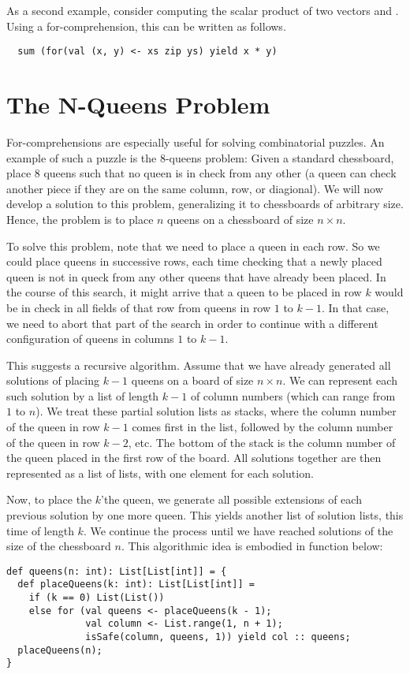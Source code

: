 As a second example, consider computing the scalar product of two
vectors  and . Using a for-comprehension, this can
be written as follows.
\begin{lstlisting}
  sum (for(val (x, y) <- xs zip ys) yield x * y)
\end{lstlisting}

\section{The N-Queens Problem}

For-comprehensions are especially useful for solving combinatorial
puzzles. An example of such a puzzle is the 8-queens problem: Given a
standard chessboard, place 8 queens such that no queen is in check from any
other (a queen can check another piece if they are on the same
column, row, or diagional). We will now develop a solution to this
problem, generalizing it to chessboards of arbitrary size. Hence, the
problem is to place $n$ queens on a chessboard of size $n \times n$.

To solve this problem, note that we need to place a queen in each row.
So we could place queens in successive rows, each time checking that a
newly placed queen is not in queck from any other queens that have
already been placed. In the course of this search, it might arrive
that a queen to be placed in row $k$ would be in check in all fields
of that row from queens in row $1$ to $k-1$. In that case, we need to
abort that part of the search in order to continue with a different
configuration of queens in columns $1$ to $k-1$.

This suggests a recursive algorithm.  Assume that we have already
generated all solutions of placing $k-1$ queens on a board of size $n
\times n$. We can represent each such solution by a list of length
$k-1$ of column numbers (which can range from $1$ to $n$).  We treat
these partial solution lists as stacks, where the column number of the
queen in row $k-1$ comes first in the list, followed by the column
number of the queen in row $k-2$, etc. The bottom of the stack is the
column number of the queen placed in the first row of the board.  All
solutions together are then represented as a list of lists, with one
element for each solution.

Now, to place the $k$'the queen, we generate all possible extensions
of each previous solution by one more queen. This yields another list
of solution lists, this time of length $k$. We continue the process
until we have reached solutions of the size of the chessboard $n$.
This algorithmic idea is embodied in function  below:
\begin{lstlisting}
def queens(n: int): List[List[int]] = {
  def placeQueens(k: int): List[List[int]] =
    if (k == 0) List(List())
    else for (val queens <- placeQueens(k - 1);
              val column <- List.range(1, n + 1);
              isSafe(column, queens, 1)) yield col :: queens;
  placeQueens(n);
}
\end{lstlisting}

